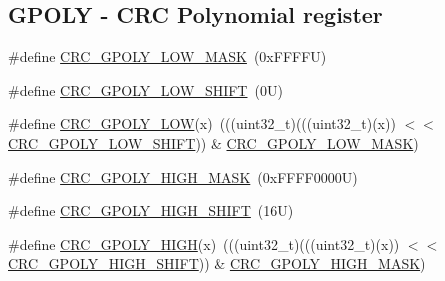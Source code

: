 \subsection*{G\+P\+O\+LY -\/ C\+RC Polynomial register}
\begin{DoxyCompactItemize}
\item 
\#define \mbox{\hyperlink{group___c_r_c___register___masks_ga861d4f6f458051a63a7b01e6e5d8794b}{C\+R\+C\+\_\+\+G\+P\+O\+L\+Y\+\_\+\+L\+O\+W\+\_\+\+M\+A\+SK}}~(0x\+F\+F\+F\+F\+U)
\item 
\#define \mbox{\hyperlink{group___c_r_c___register___masks_ga3830f95399bd5190027aaf00f307d10b}{C\+R\+C\+\_\+\+G\+P\+O\+L\+Y\+\_\+\+L\+O\+W\+\_\+\+S\+H\+I\+FT}}~(0\+U)
\item 
\#define \mbox{\hyperlink{group___c_r_c___register___masks_ga66c5ae199c9bb4ee3951fea40d201c27}{C\+R\+C\+\_\+\+G\+P\+O\+L\+Y\+\_\+\+L\+OW}}(x)~(((uint32\+\_\+t)(((uint32\+\_\+t)(x)) $<$$<$ \mbox{\hyperlink{group___c_r_c___register___masks_ga3830f95399bd5190027aaf00f307d10b}{C\+R\+C\+\_\+\+G\+P\+O\+L\+Y\+\_\+\+L\+O\+W\+\_\+\+S\+H\+I\+FT}})) \& \mbox{\hyperlink{group___c_r_c___register___masks_ga861d4f6f458051a63a7b01e6e5d8794b}{C\+R\+C\+\_\+\+G\+P\+O\+L\+Y\+\_\+\+L\+O\+W\+\_\+\+M\+A\+SK}})
\item 
\#define \mbox{\hyperlink{group___c_r_c___register___masks_ga96c07e55f3d3c43d7b3e7637bc854ed6}{C\+R\+C\+\_\+\+G\+P\+O\+L\+Y\+\_\+\+H\+I\+G\+H\+\_\+\+M\+A\+SK}}~(0x\+F\+F\+F\+F0000\+U)
\item 
\#define \mbox{\hyperlink{group___c_r_c___register___masks_ga991debc471e54dcf5297d6a42c5778e6}{C\+R\+C\+\_\+\+G\+P\+O\+L\+Y\+\_\+\+H\+I\+G\+H\+\_\+\+S\+H\+I\+FT}}~(16\+U)
\item 
\#define \mbox{\hyperlink{group___c_r_c___register___masks_ga7e1477223f91dd35945f2f5895a346c5}{C\+R\+C\+\_\+\+G\+P\+O\+L\+Y\+\_\+\+H\+I\+GH}}(x)~(((uint32\+\_\+t)(((uint32\+\_\+t)(x)) $<$$<$ \mbox{\hyperlink{group___c_r_c___register___masks_ga991debc471e54dcf5297d6a42c5778e6}{C\+R\+C\+\_\+\+G\+P\+O\+L\+Y\+\_\+\+H\+I\+G\+H\+\_\+\+S\+H\+I\+FT}})) \& \mbox{\hyperlink{group___c_r_c___register___masks_ga96c07e55f3d3c43d7b3e7637bc854ed6}{C\+R\+C\+\_\+\+G\+P\+O\+L\+Y\+\_\+\+H\+I\+G\+H\+\_\+\+M\+A\+SK}})
\end{DoxyCompactItemize}
